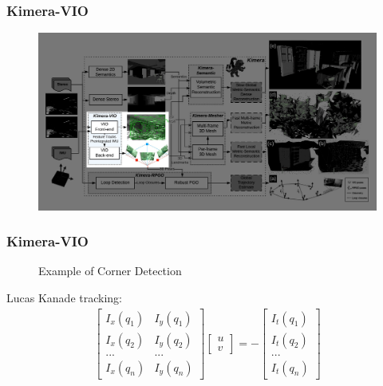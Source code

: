 \documentclass[11pt]{beamer}
\begin{document}
\begin{frame}
\frametitle{Kimera-VIO}
\begin{figure}
    \includegraphics[width=\linewidth]{kimera_chart_VIO.jpeg} 
\end{figure}
\end{frame}
\begin{frame}
    \frametitle{Kimera-VIO} 
    \begin{figure}[ht]
        \centering
        \caption{Example of Corner Detection \cite{Shi_tomasi}}
    \end{figure}
Lucas Kanade \cite{lucas1981iterative} tracking:
\begin{align*}
           \begin{bmatrix}
               I_x (q_1) & I_y (q_1) \\ I_x (q_2) & I_y (q_2) \\  ... & ... \\I_x (q_n) & I_y (q_n)
           \end{bmatrix} 
           \begin{bmatrix}
               u \\ v
           \end{bmatrix} 
           = - 
           \begin{bmatrix}
               I_t (q_1) \\I_t (q_2) \\  ...\\I_t (q_n) 
           \end{bmatrix} 
\end{align*}
\end{frame}
\end{document}
